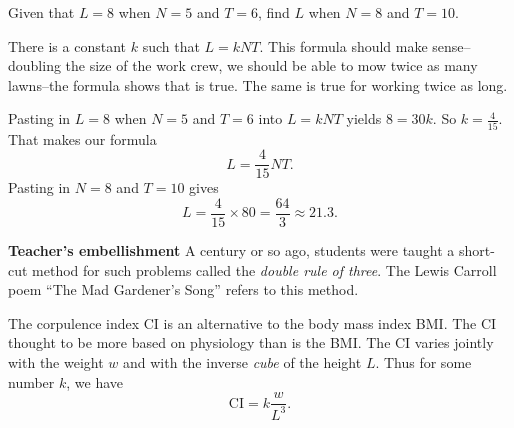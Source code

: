 \documentclass[12pt,fleqn,answers]{exam}
\begin{document}
\begin{questions}
Given that $L = 8$ when $N = 5$ and $T = 6$, find $L$ when
$N = 8$ and $T = 10$.
\begin{solution}[3.5in]
There is a constant $k$ such that $L =k N T$. This formula should make sense--doubling the size of the work crew, we
should be able to mow twice as many lawns--the formula shows that is true. The same is true for working twice as long.

Pasting in $L = 8$ when $N = 5$ and $T = 6$ into $L =k N T$ yields $8 = 30 k$.  So $k = \frac{4}{15}$.  That makes
our formula
\begin{equation*}
L = \frac{4}{15} N T.
\end{equation*}
Pasting in $N = 8$ and $T = 10$ gives
\begin{equation*}
L = \frac{4}{15} \times 80 = \frac{64}{3} \approx 21.3.
\end{equation*}


\textbf{Teacher's embellishment} A century or so ago, students were taught 
a short-cut method for such problems called the \emph{double rule of three}.
The Lewis Carroll poem ``The Mad Gardener's Song'' refers to this method.


\end{solution}


\question The corpulence index CI is an alternative to the 
body mass index BMI. The CI thought to be more based on physiology than 
is the BMI. The CI varies jointly with the weight $w$ and with the inverse 
\emph{cube} of the height $L$. Thus for some number $k$, we have
\begin{equation*}
    \mathrm{CI} = k  \frac{w}{L^3}.
\end{equation*}

\end{questions}
\end{document}
